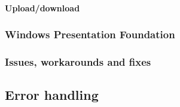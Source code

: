 \paragraph{Upload/download} 

\subsubsection{Windows Presentation Foundation}
\label{Implementation_Client_Architecture_WPF}

\subsubsection{Issues, workarounds and fixes}
\label{Implementation_Client_Architecture_Issues}

\subsection{Error handling}
\label{Implementation_Client_Error}

\class{}